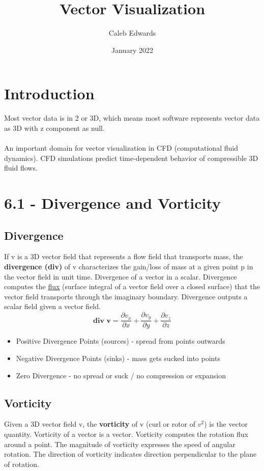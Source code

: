 \documentclass{article}
\title{Vector Visualization}
\author{Caleb Edwards}
\date{January 2022}
\begin{document}
\maketitle

\section*{Introduction}
Most vector data is in 2 or 3D, which means most software represents vector data as 3D with z component as null.
\\\\
An important domain for vector visualization in CFD (computational fluid dynamics). CFD simulations predict time-dependent behavior of compressible 3D fluid flows.

\section*{6.1 - Divergence and Vorticity}
\subsection*{Divergence}
If v is a 3D vector field that represents a flow field that transports mass, the \textbf{divergence (div)} of v characterizes the gain/loss of mass at a given point p in the vector field in unit time. Divergence of a vector in a scalar. Divergence computes the \href{http://www-solar.mcs.st-and.ac.uk/~alan/MT3601/Fundamentals/node6.html}{flux} (surface integral of a vector field over a closed surface) that the vector field transports through the imaginary boundary. Divergence outputs a scalar field given a vector field. 
\begin{equation}
    \textbf{div v} = \frac{\partial v_x}{\partial x} + \frac{\partial v_y}{\partial y} + \frac{\partial v_z}{\partial z}
\end{equation}
\begin{itemize}
    \item Positive Divergence Points (sources) - spread from points outwards
    \item Negative Divergence Points (sinks) - mass gets sucked into points
    \item Zero Divergence - no spread or suck / no compression or expansion
\end{itemize}

\subsection*{Vorticity}
Given a 3D vector field v, the \textbf{vorticity} of v (curl or rotor of $v^2$) is the vector quantity. Vorticity of a vector is a vector. Vorticity computes the rotation flux around a point. The magnitude of vorticity expresses the speed of angular rotation. The direction of vorticity indicates direction perpendicular to the plane of rotation.
\end{document}
